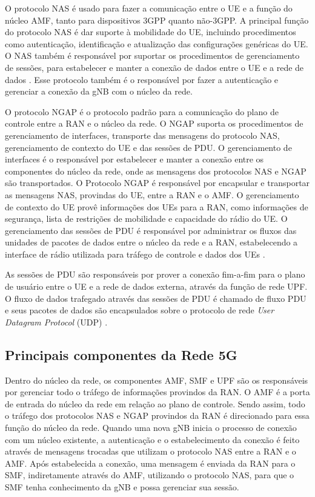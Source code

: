 O protocolo NAS é usado para fazer a comunicação entre o UE e a função do núcleo AMF, tanto para dispositivos 3GPP quanto não-3GPP. A principal função do protocolo NAS é dar suporte à mobilidade do UE, incluindo procedimentos como autenticação, identificação e atualização das configurações genéricas do UE. O NAS também é responsável por suportar os procedimentos de gerenciamento de sessões, para estabelecer e manter a conexão de dados entre o UE e a rede de dados \cite{3gpp.24.501}. Esse protocolo também é o responsável por fazer a autenticação e gerenciar a conexão da gNB com o núcleo da rede.

O protocolo NGAP é o protocolo padrão para a comunicação do plano de controle entre a RAN e o núcleo da rede. O NGAP suporta os procedimentos de gerenciamento de interfaces, transporte das mensagens do protocolo NAS, gerenciamento de contexto do UE e das sessões de PDU. O gerenciamento de interfaces é o responsável por estabelecer e manter a conexão entre os componentes do núcleo da rede, onde as mensagens dos protocolos NAS e NGAP são transportados. O Protocolo NGAP é responsável por encapsular e transportar as mensagens NAS, provindas do UE, entre a RAN e o AMF. O gerenciamento de contexto do UE provê informações dos UEs para a RAN, como informações de segurança, lista de restrições de mobilidade e capacidade do rádio do UE. O gerenciamento das sessões de PDU é responsável por administrar os fluxos das unidades de pacotes de dados entre o núcleo da rede e a RAN, estabelecendo a interface de rádio utilizada para tráfego de controle e dados dos UEs \cite{3gpp.38.413}.

As sessões de PDU são responsáveis por prover a conexão fim-a-fim para o plano de usuário entre o UE e a rede de dados externa, através da função de rede UPF.
O fluxo de dados trafegado através das sessões de PDU é chamado de fluxo PDU e seus pacotes de dados são encapsulados sobre o protocolo de rede \textit{User Datagram Protocol} (UDP) \cite{3gpp.38.415}.

\subsection{Principais componentes da Rede 5G}
\label{sub:components}

Dentro do núcleo da rede, os componentes AMF, SMF e UPF são os responsáveis por gerenciar todo o tráfego de informações provindos da RAN.
O AMF é a porta de entrada do núcleo da rede em relação ao plano de controle.
Sendo assim, todo o tráfego dos protocolos NAS e NGAP provindos da RAN é direcionado para essa função do núcleo da rede.
Quando uma nova gNB inicia o processo de conexão com um núcleo existente, a autenticação e o estabelecimento da conexão é feito através de mensagens trocadas que utilizam o protocolo NAS entre a RAN e o AMF.
Após estabelecida a conexão, uma mensagem é enviada da RAN para o SMF, indiretamente através do AMF, utilizando o protocolo NAS, para que o SMF tenha conhecimento da gNB e possa gerenciar sua sessão.

